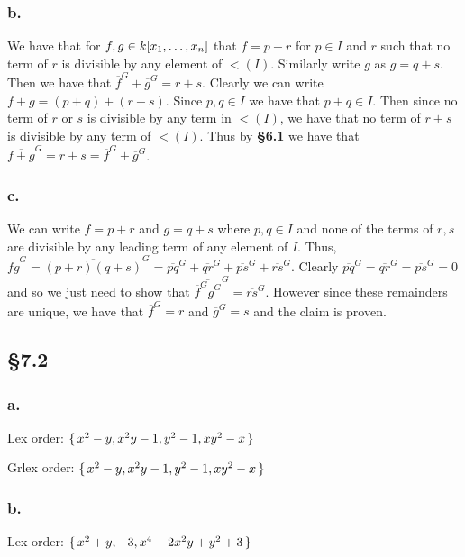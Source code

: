 \documentclass[letterpaper]{article}
\begin{document}
\subsubsection*{b.}

We have that for $f, g \in k\bqty{x_{1}, \ldots, x_{n}}$ that $f = p + r$ for $p \in I$ and $r$ such that no term of $r$ is divisible by any element of $\lt(I)$.
Similarly write $g$ as $g = q + s$.
Then we have that $\overline{f}^{G} + \overline{g}^{G} = r + s$.
Clearly we can write $f + g = (p + q) + (r + s)$.
Since $p, q \in I$ we have that $p + q \in I$.
Then since no term of $r$ or $s$ is divisible by any term in $\lt(I)$, we have that no term of $r + s$ is divisible by any term of $\lt(I)$.
Thus by \textbf{\S 6.1} we have that $\overline{f + g}^{G} = r + s = \overline{f}^{G} + \overline{g}^{G}$.

\subsubsection*{c.}

We can write $f = p + r$ and $g = q + s$ where $p, q \in I$ and none of the terms of $r, s$ are divisible by any leading term of any element of $I$.
Thus, $\overline{fg}^G = \overline{(p + r)(q + s)}^G = \overline{pq}^G + \overline{qr}^G + \overline{ps}^G + \overline{rs}^G$.
Clearly $\overline{pq}^G = \overline{qr}^G = \overline{ps}^G = 0$ and so we just need to show that $ \overline{\overline{f}^G \overline{g}^G}^G = \overline{rs}^G$.
However since these remainders are unique, we have that $\overline{f}^{G} = r$ and $\overline{g}^{G} = s$ and the claim is proven.

\subsection*{\S 7.2}

\subsubsection*{a.}

Lex order: $\set{x^{2} - y, x^{2} y - 1, y^{2} - 1, x y^{2} - x}$

Grlex order: $\set{x^{2} - y, x^{2} y - 1, y^{2} - 1, x y^{2} - x}$

\subsubsection*{b.}

Lex order: $\set{x^{2} + y, -3, x^{4} + 2 x^{2} y + y^{2} + 3}$
\end{document}
